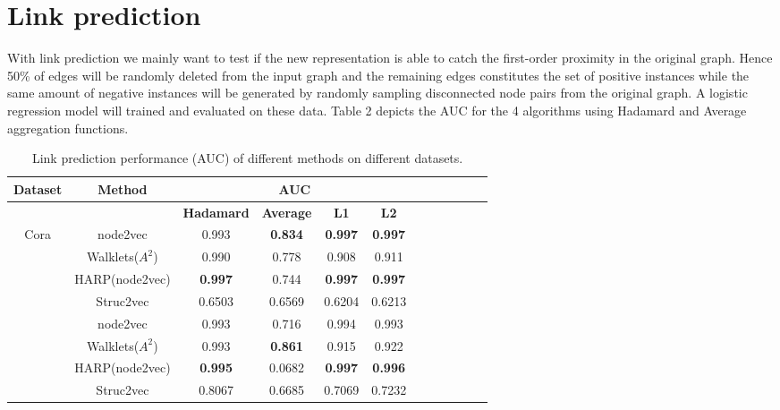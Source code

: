 \documentclass[a4paper,13pt]{article}
\newcommand\Tstrut{\rule{0pt}{3ex}}         %
\newcommand\Bstrut{\rule[-0.9ex]{0pt}{0pt}}
\begin{document}
\bigbreak

\section{Link prediction}
With link prediction we mainly want to test if the new representation is able to catch the first-order proximity in the original graph. Hence 50\% of edges will be randomly deleted from the input graph and the remaining edges constitutes the set of positive instances while the same amount of negative instances will be generated by randomly sampling disconnected node pairs from the original graph. A logistic regression model will trained and evaluated on these data. Table 2 depicts the AUC for the 4 algorithms using Hadamard and Average aggregation functions.

\begin{table}[H]

    \begin{center}
\begin{tabular}{cccc ccc ccc cc}
\hline
\textbf{Dataset}&
\textbf{Method}&
\multicolumn{4}{c}{\textbf{AUC} }& \Tstrut\\
  \hline  
\Tstrut
\Tstrut
  &  & \textbf{Hadamard}  &  \textbf{Average} & \textbf{L1} & \textbf{L2} &  \Tstrut\\

 \multirow{5}{*}{Cora}&node2vec & 0.993 &\textbf{0.834} & \textbf{0.997} & \textbf{0.997} &\Tstrut\\
   & Walklets($A^2$)  & 0.990 &  0.778 & 0.908 & 0.911 &\Tstrut\\
   & HARP(node2vec)  &\textbf{0.997} &0.744 & \textbf{0.997} & \textbf{0.997} &\Tstrut\\
   & Struc2vec & 0.6503 & 0.6569 & 0.6204 & 0.6213 & \Tstrut\\
     \hline 
     
      \Bstrut
  \multirow{5}{*}{Citeseer}&node2vec  & 0.993 &0.716& 0.994 & 0.993 &\Tstrut\\
   &  Walklets($A^2$)  & 0.993& \textbf{0.861} & 0.915 & 0.922 &\Tstrut\\
    &  HARP(node2vec)  & \textbf{0.995} & 0.0682& \textbf{0.997} & \textbf{0.996} &\Tstrut\\
  &  Struc2vec  &  0.8067  & 0.6685 & 0.7069 & 0.7232 &\Tstrut\\
   
    
  \hline 
\end{tabular}
\label{tab:partial}
\end{center}
\caption{ Link prediction performance (AUC) of different methods on different datasets.}
\end{table}
\bigbreak
\end{document}

